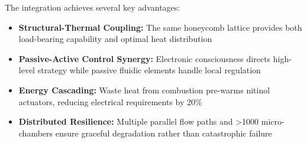 The integration achieves several key advantages:
\begin{itemize}
    \item \textbf{Structural-Thermal Coupling:} The same honeycomb lattice provides both load-bearing capability and optimal heat distribution
    \item \textbf{Passive-Active Control Synergy:} Electronic consciousness directs high-level strategy while passive fluidic elements handle local regulation
    \item \textbf{Energy Cascading:} Waste heat from combustion pre-warms nitinol actuators, reducing electrical requirements by 20\%
    \item \textbf{Distributed Resilience:} Multiple parallel flow paths and >1000 micro-chambers ensure graceful degradation rather than catastrophic failure
\end{itemize}